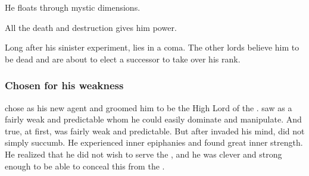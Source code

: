 He floats through mystic dimensions. 


All the death and destruction gives him power.


Long after his sinister experiment, \Gevural{} lies in a coma. 
The other \resphan{} lords believe him to be dead and are about to elect a successor to take over his rank.







\subsubsection{Chosen for his weakness}
\Daggerrain chose \Gepheral as his new agent and groomed him to be the High Lord of the \Resphain. 
\Daggerrain saw \Gepheral as a fairly weak and predictable \resphan whom he could easily dominate and manipulate. 
And true, at first, \Gepheral was fairly weak and predictable.
But after \Daggerrain invaded his mind, \Gepheral did not simply succumb. 
He experienced inner epiphanies and found great inner strength.
He realized that he did not wish to serve the \banes, and he was clever and strong enough to be able to conceal this from the \banes.





